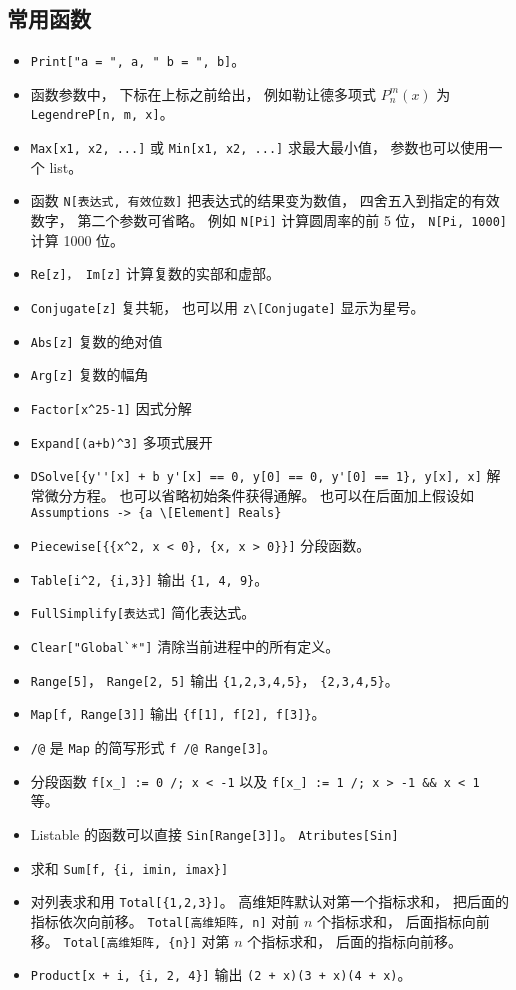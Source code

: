 \subsection{常用函数}
\begin{itemize}
\item \verb|Print["a = ", a, " b = ", b]|。
\item 函数参数中， 下标在上标之前给出， 例如勒让德多项式 $P_n^m(x)$ 为 \verb|LegendreP[n, m, x]|。
\item \verb|Max[x1, x2, ...]| 或 \verb|Min[x1, x2, ...]| 求最大最小值， 参数也可以使用一个 list。
\item 函数 \verb|N[表达式, 有效位数]| 把表达式的结果变为数值， 四舍五入到指定的有效数字， 第二个参数可省略。 例如 \verb|N[Pi]| 计算圆周率的前 5 位， \verb|N[Pi, 1000]| 计算 1000 位。
\item \verb|Re[z]， Im[z]| 计算复数的实部和虚部。
\item \verb|Conjugate[z]| 复共轭， 也可以用 \verb|z\[Conjugate]| 显示为星号。
\item \verb|Abs[z]| 复数的绝对值
\item \verb|Arg[z]| 复数的幅角
\item \verb|Factor[x^25-1]| 因式分解
\item \verb|Expand[(a+b)^3]| 多项式展开
\item \verb|DSolve[{y''[x] + b y'[x] == 0, y[0] == 0, y'[0] == 1}, y[x], x]| 解常微分方程。 也可以省略初始条件获得通解。 也可以在后面加上假设如 \verb|Assumptions -> {a \[Element] Reals}|
\item \verb|Piecewise[{{x^2, x < 0}, {x, x > 0}}]| 分段函数。
\item \verb|Table[i^2, {i,3}]| 输出 \verb|{1, 4, 9}|。
\item \verb|FullSimplify[表达式]| 简化表达式。
\item \verb|Clear["Global`*"]| 清除当前进程中的所有定义。
\item \verb|Range[5]|， \verb|Range[2, 5]| 输出 \verb|{1,2,3,4,5}|， \verb|{2,3,4,5}|。
\item \verb|Map[f, Range[3]]| 输出 \verb|{f[1], f[2], f[3]}|。
\item \verb|/@| 是 \verb|Map| 的简写形式 \verb|f /@ Range[3]|。
\item 分段函数 \verb|f[x_] := 0 /; x < -1| 以及 \verb|f[x_] := 1 /; x > -1 && x < 1| 等。
\item Listable 的函数可以直接 \verb|Sin[Range[3]]|。 \verb|Atributes[Sin]|
\item 求和 \verb|Sum[f, {i, imin, imax}]|
\item 对列表求和用 \verb|Total[{1,2,3}]|。 高维矩阵默认对第一个指标求和， 把后面的指标依次向前移。 \verb|Total[高维矩阵, n]| 对前 $n$ 个指标求和， 后面指标向前移。 \verb|Total[高维矩阵, {n}]| 对第 $n$ 个指标求和， 后面的指标向前移。
\item \verb|Product[x + i, {i, 2, 4}]| 输出 \verb|(2 + x)(3 + x)(4 + x)|。
\end{itemize}

